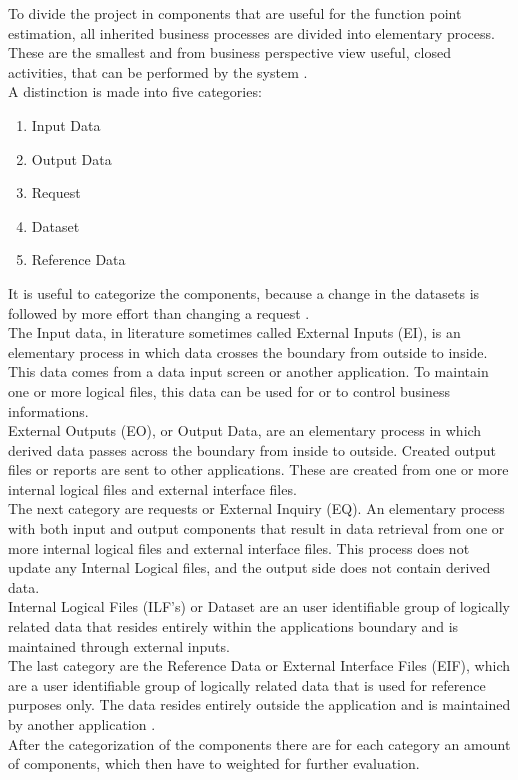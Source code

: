 To divide the project in components that are useful for the function point estimation, all inherited business processes are divided into elementary process. These are the smallest and from business perspective view useful, closed activities, that can be performed by the system \cite{FPKompakt}.\\
A distinction is made into five categories:
\begin{enumerate}
	\item Input Data
	\item Output Data
	\item Request
	\item Dataset
	\item Reference Data
\end{enumerate}
It is useful to categorize the components, because a change in the datasets is followed by more effort than changing a request \cite{itplanung}.\\
The Input data, in literature sometimes called External Inputs (EI), is an elementary process in which data crosses the boundary from outside to inside. This data comes from a data input screen or another application. To maintain one or more logical files, this data can be used for or to control business informations.\\
External Outputs (EO), or Output Data, are an elementary process in which derived data passes across the boundary from inside to outside. Created output files or reports are sent to other applications. These are created from one or more internal logical files and external interface files.\\
The next category are requests or External Inquiry (EQ). An elementary process with both input and output components that result in data retrieval from one or more internal logical files and external interface files. This process does not update any Internal Logical files, and the output side does not contain derived data.\\
Internal Logical Files (ILF’s) or Dataset are an user identifiable group of logically related data that resides entirely within the applications boundary and is maintained through external inputs.\\
The last category are the Reference Data or External Interface Files (EIF), which are a user identifiable group of logically related data that is used for reference purposes only. The data resides entirely outside the application and is maintained by another application \cite{fpafundamentals}.\\
After the categorization of the components there are for each category an amount of components, which then have to weighted for further evaluation.

